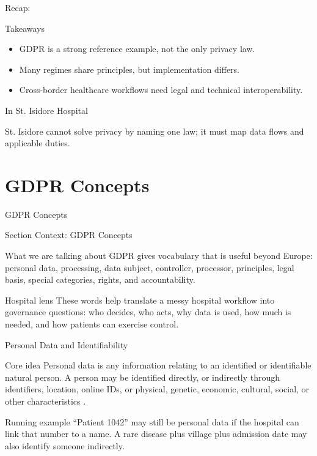 \documentclass[presentation]{beamer}
\newcommand{\sectiontitleframe}[1]{
\begin{frame}[plain,c]
\begin{center}
{\usebeamerfont{title}\usebeamercolor[fg]{title}#1}
\end{center}
\end{frame}
}
\newcommand{\scenario}{St. Isidore Hospital}
\newcommand{\takeawaysframe}[2]{
\begin{frame}[c]{Recap: \insertsection}
\begin{block}{Takeaways}
#1
\end{block}
\begin{exampleblock}{In \scenario}
#2
\end{exampleblock}
\end{frame}
}
\begin{document}
\takeawaysframe{
\begin{itemize}
    \item GDPR is a strong reference example, not the only privacy law.
    \item Many regimes share principles, but implementation differs.
    \item Cross-border healthcare workflows need legal and technical interoperability.
\end{itemize}
}{
St. Isidore cannot solve privacy by naming one law; it must map data flows and applicable duties.
}

\section{GDPR Concepts}
\sectiontitleframe{GDPR Concepts}

\begin{frame}[c]{Section Context: GDPR Concepts}
\begin{block}{What we are talking about}
GDPR gives vocabulary that is useful beyond Europe: personal data, processing, data subject,
controller, processor, principles, legal basis, special categories, rights, and accountability.
\end{block}

\begin{exampleblock}{Hospital lens}
These words help translate a messy hospital workflow into governance questions: who decides, who
acts, why data is used, how much is needed, and how patients can exercise control.
\end{exampleblock}
\end{frame}

\begin{frame}[c]{Personal Data and Identifiability}
\begin{block}{Core idea}
Personal data is any information relating to an identified or identifiable natural person. A person
may be identified directly, or indirectly through identifiers, location, online IDs, or physical,
genetic, economic, cultural, social, or other characteristics \cite{eurlex_gdpr}.
\end{block}

\begin{exampleblock}{Running example}
``Patient 1042'' may still be personal data if the hospital can link that number to a name. A rare
disease plus village plus admission date may also identify someone indirectly.
\end{exampleblock}
\end{frame}
\end{document}

